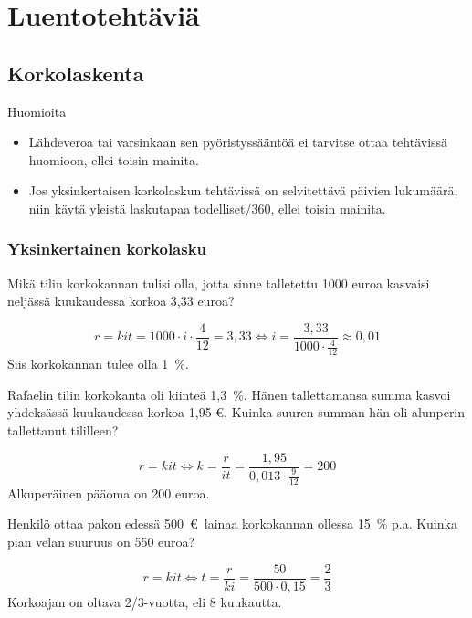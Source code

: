 \documentclass[a4paper,10pt]{article}\usepackage[]{graphicx}\usepackage[]{color}
\begin{document}
\pagestyle{empty}

\section*{Luentotehtäviä}

\subsection*{Korkolaskenta}

Huomioita
\begin{itemize}
    \item Lähdeveroa tai varsinkaan sen pyöristyssääntöä ei tarvitse ottaa tehtävissä huomioon, ellei toisin mainita.
    \item Jos yksinkertaisen korkolaskun tehtävissä on selvitettävä päivien lukumäärä, niin käytä yleistä laskutapaa todelliset/360, ellei toisin mainita.
\end{itemize}

\subsubsection*{Yksinkertainen korkolasku}

\begin{question} Mikä tilin korkokannan tulisi olla, jotta sinne talletettu 1000 euroa kasvaisi neljässä kuukaudessa korkoa 3,33 euroa?
\end{question}\begin{solution}
    \[
    r = kit = 1000\cdot i\cdot \frac{4}{12} = 3,33\Leftrightarrow i = \frac{3,33}{1000\cdot\frac{4}{12}}\approx 0,01
    \]
    Siis korkokannan tulee olla 1~\%.
\end{solution}

\begin{question} Rafaelin tilin korkokanta oli kiinteä 1,3~\%. Hänen tallettamansa summa kasvoi yhdeksässä kuukaudessa korkoa 1,95 \euro.
Kuinka suuren summan hän oli alunperin tallettanut tililleen?
\end{question}\begin{solution}
    \[
    r = kit \Leftrightarrow k = \frac{r}{it} = \frac{1,95}{0,013\cdot\frac{9}{12}} = 200
    \]
    Alkuperäinen pääoma on 200 euroa.
\end{solution}

\begin{question} Henkilö ottaa pakon edessä 500~\euro\ lainaa korkokannan ollessa 15~\% p.a. Kuinka pian velan suuruus on 550 euroa?
\end{question}\begin{solution}
    \[
        r = kit \Leftrightarrow t = \frac{r}{ki} = \frac{50}{500\cdot0,15} = \frac{2}{3}
    \]
    Korkoajan on oltava 2/3-vuotta, eli 8 kuukautta.
\end{solution}
\end{document}
